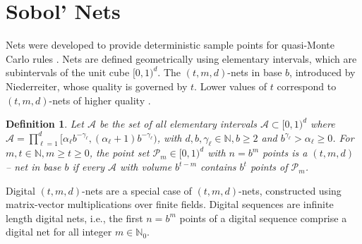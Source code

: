 \documentclass{svjour3}                     %
\newtheorem{defn}{Definition}
\newcommand{\naturals}{\mathbb{N}}
\newcommand{\JRNote}[1]{{\textcolor{green}{JR: #1}}}
\begin{document}
\section{Sobol' Nets}


Nets were developed to provide deterministic sample points for quasi-Monte Carlo rules \cite{Nie05a}. Nets are defined geometrically using elementary intervals, which are subintervals of the unit cube $[0,1)^d$.
The $(t,m, d)$-nets in base $b$, introduced by Niederreiter, 
whose quality is governed by $t$. Lower values of $t$ correspond to $(t,m, d)$-nets of higher quality \cite{Bald10a}.

\begin{defn}
	\label{defn:tmd_net}
	Let $\mathcal{A}$ be the set of all elementary intervals $\mathcal{A} \subset [0, 1)^d$ where
	$\mathcal{A} = \prod_{\ell=1}^d [\alpha_\ell b^{-\gamma_\ell} , (\alpha_\ell + 1) b^{-\gamma_\ell})$, 
	with $d,b,\gamma_\ell \in \naturals, b \ge 2$ 
	and $b^{\gamma_\ell}
	> \alpha_\ell \ge 0$. For $m,t \in \naturals, m \ge t \ge 0$, the point set $\mathcal{P}_m \in [0, 1)^d$ with $n = b^m$ points is a $(t, m, d)$ -- net in base $b$ if every $\mathcal{A}$ with volume $b^{t-m}$ contains $b^t$ points of $\mathcal{P}_m$.
\end{defn}

Digital $(t,m, d)$-nets are a special case of $(t,m, d)$-nets, constructed using matrix-vector multiplications over finite fields. Digital sequences are infinite length digital nets, i.e., the first $n=b^m$ points of a digital sequence comprise a digital net for all integer $m \in \naturals_0$.
\end{document}
